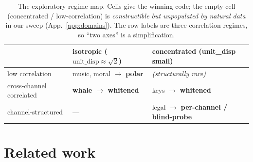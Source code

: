 \documentclass[10pt]{article} %
\theoremstyle{remark}
\begin{document}
\begin{table}[h]\small\centering
\caption{The exploratory regime map. Cells give the winning code; the empty cell
(concentrated / low-correlation) is \emph{constructible but unpopulated by natural data} in
our sweep (App.~\ref{app:domains}). The row labels are three correlation regimes, so ``two
axes'' is a simplification.}
\label{tab:regime}
\begin{tabular}{@{}l>{\centering\arraybackslash}p{3.2cm}>{\centering\arraybackslash}p{3.2cm}@{}}
\toprule
 & isotropic ($\text{unit\_disp}\approx\sqrt2$) & concentrated (unit\_disp small) \\
\midrule
low correlation & music, moral $\to$ \textbf{polar} & \emph{(structurally rare)} \\
cross-channel correlated & \textbf{whale $\to$ whitened} & keys $\to$ \textbf{whitened} \\
channel-structured & --- & legal $\to$ \textbf{per-channel / blind-probe} \\
\bottomrule
\end{tabular}
\end{table}

\section{Related work}\label{sec:related}
\end{document}
